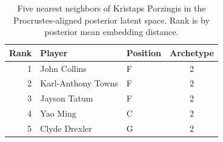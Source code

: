 \begin{table}[htbp]
  \centering\small
  \begin{tabular}{rllc}
    \toprule
    Rank & Player & Position & Archetype \\
    \midrule
    1 & John Collins & F & 2 \\
    2 & Karl-Anthony Towns & F & 2 \\
    3 & Jayson Tatum & F & 2 \\
    4 & Yao Ming & C & 2 \\
    5 & Clyde Drexler & G & 2 \\
    \bottomrule
  \end{tabular}
  \caption{Five nearest neighbors of Kristaps Porzingis in the Procrustes-aligned posterior latent space. Rank is by posterior mean embedding distance.}
\end{table}

